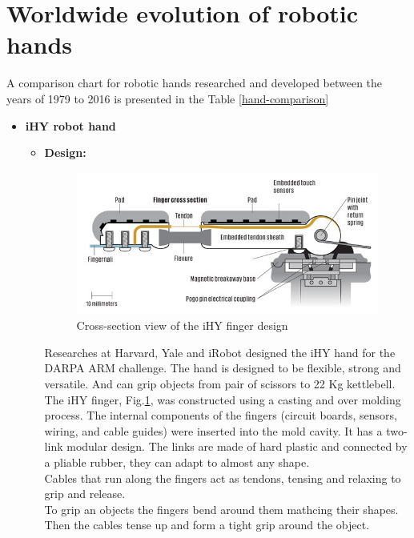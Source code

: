 \documentclass[a4paper, 10pt, conference]{ieeeconf}      %
\begin{document}
\section{\textbf{Worldwide evolution of robotic hands}}
A comparison chart for robotic hands researched and developed between the years of 1979 to 2016 is presented in the Table \ref{hand-comparison}\\
\begin{itemize}
\item \textbf{iHY robot hand}
	\begin{itemize}
		\item \textbf{Design:}\\
	\begin{figure}[h!]
	\centering
  \includegraphics[width= 1.0\linewidth]{./images/ihyCS}
  \caption{Cross-section view of the iHY finger design}
  \label{fig:ihyCS}
	\end{figure}
Researches at Harvard, Yale and iRobot designed the iHY hand for the DARPA ARM challenge. The hand is designed to be flexible, strong and versatile. And can grip objects from pair of scissors to 22 Kg kettlebell.\\
The iHY finger, Fig.\ref{fig:ihyCS}, was constructed using a casting and over molding process. The internal components of the fingers (circuit boards, sensors, wiring, and cable guides) were inserted into the mold cavity.
It has a two-link modular design. The links are made of hard plastic and connected by a pliable rubber, they can adapt to almost any shape.\\
Cables that run along the fingers act as tendons, tensing and relaxing to grip and release.\\
To grip an objects the fingers bend around them mathcing their shapes. Then the cables tense up and form a tight grip around the object.\\

\end{itemize}
\end{itemize}
\end{document}
